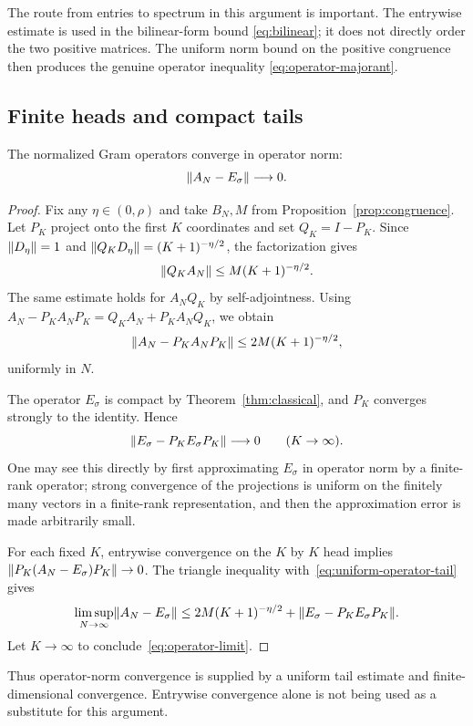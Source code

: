 The route from entries to spectrum in this argument is important.
The entrywise estimate is used in the bilinear-form bound
\eqref{eq:bilinear}; it does not directly order the two positive
matrices. The uniform norm bound on the positive congruence then
produces the genuine operator inequality
\eqref{eq:operator-majorant}.

\subsection{Finite heads and compact tails}

\begin{proposition}
\label{prop:operator-convergence}
The normalized Gram operators converge in operator norm:
\begin{equation}
 \lVert A_N-E_\sigma\rVert\longrightarrow0.
 \label{eq:operator-limit}
\end{equation}
\end{proposition}

\begin{proof}
Fix any $\eta\in(0,\rho)$ and take $B_N,M$ from
Proposition~\ref{prop:congruence}. Let $P_K$ project onto the
first $K$ coordinates and set $Q_K=I-P_K$. Since
$\lVert D_\eta\rVert=1$ and
$\lVert Q_KD_\eta\rVert=(K+1)^{-\eta/2}$, the factorization gives
\begin{equation}
 \lVert Q_KA_N\rVert
 \le M(K+1)^{-\eta/2}.
 \label{eq:one-sided-tail}
\end{equation}
The same estimate holds for $A_NQ_K$ by self-adjointness. Using
$A_N-P_KA_NP_K=Q_KA_N+P_KA_NQ_K$, we obtain
\begin{equation}
 \lVert A_N-P_KA_NP_K\rVert
 \le2M(K+1)^{-\eta/2},
 \label{eq:uniform-operator-tail}
\end{equation}
uniformly in $N$.

The operator $E_\sigma$ is compact by
Theorem~\ref{thm:classical}, and $P_K$ converges strongly to the
identity. Hence
\begin{equation}
 \lVert E_\sigma-P_KE_\sigma P_K\rVert\longrightarrow0
 \qquad(K\to\infty).
 \label{eq:limit-tail}
\end{equation}
One may see this directly by first approximating $E_\sigma$ in
operator norm by a finite-rank operator; strong convergence of the
projections is uniform on the finitely many vectors in a finite-rank
representation, and then the approximation error is made arbitrarily
small.

For each fixed $K$, entrywise convergence on the $K$ by $K$ head
implies
$\lVert P_K(A_N-E_\sigma)P_K\rVert\to0$. The triangle inequality
with~\eqref{eq:uniform-operator-tail} gives
\begin{align*}
 \limsup_{N\to\infty}\lVert A_N-E_\sigma\rVert
 \le 2M(K+1)^{-\eta/2}
      +\lVert E_\sigma-P_KE_\sigma P_K\rVert.
\end{align*}
Let $K\to\infty$ to conclude~\eqref{eq:operator-limit}.
\end{proof}

Thus operator-norm convergence is supplied by a uniform tail estimate
and finite-dimensional convergence. Entrywise convergence alone is
not being used as a substitute for this argument.
